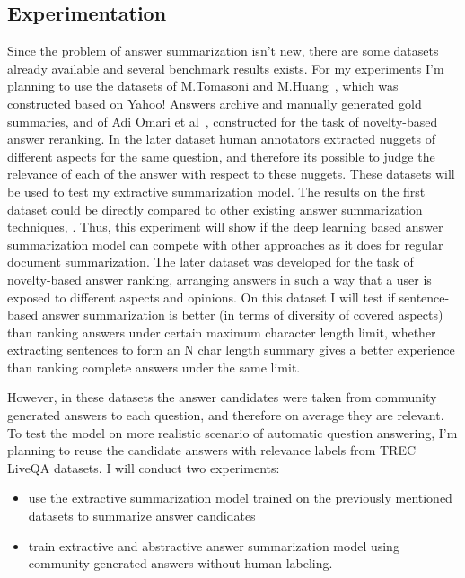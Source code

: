 \subsection{Experimentation}
\label{section:non-factoid:proposal:experiments}

Since the problem of answer summarization isn't new, there are some datasets already available and several benchmark results exists.
For my experiments I'm planning to use the datasets of M.Tomasoni and M.Huang~\cite{tomasoni2010metadata}, which was constructed based on Yahoo! Answers archive and manually generated gold summaries, and of Adi Omari et al~\cite{omari2016novelty}, constructed for the task of novelty-based answer reranking.
In the later dataset human annotators extracted nuggets of different aspects for the same question, and therefore its possible to judge the relevance of each of the answer with respect to these nuggets.
These datasets will be used to test my extractive summarization model.
The results on the first dataset could be directly compared to other existing answer summarization techniques, \eg \cite{zhaochun_sparsecoding_2016,erkan2004lexrank,tomasoni2010metadata}.
Thus, this experiment will show if the deep learning based answer summarization model can compete with other approaches as it does for regular document summarization.
The later dataset was developed for the task of novelty-based answer ranking, \ie arranging answers in such a way that a user is exposed to different aspects and opinions.
On this dataset I will test if sentence-based answer summarization is better (in terms of diversity of covered aspects) than ranking answers under certain maximum character length limit, \ie whether extracting sentences to form an N char length summary gives a better experience than ranking complete answers under the same limit.

However, in these datasets the answer candidates were taken from community generated answers to each question, and therefore on average they are relevant.
To test the model on more realistic scenario of automatic question answering, I'm planning to reuse the candidate answers with relevance labels from TREC LiveQA datasets.
I will conduct two experiments: 
\begin{itemize}
\item use the extractive summarization model trained on the previously mentioned datasets to summarize answer candidates
\item train extractive and abstractive answer summarization model using community generated answers without human labeling.
\end{itemize}

